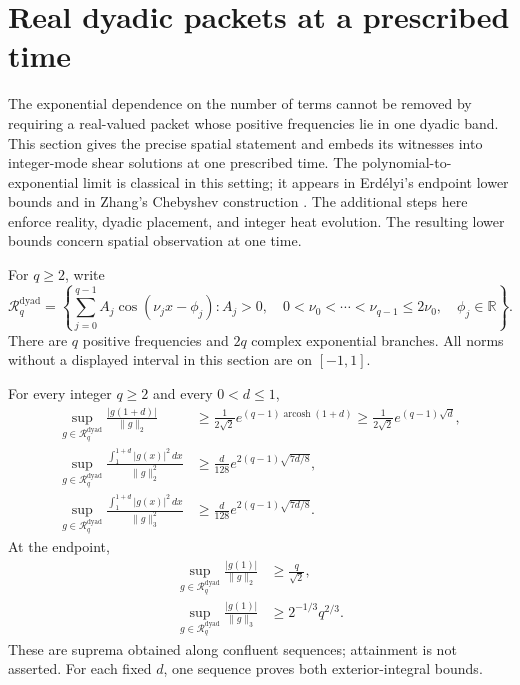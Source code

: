 \section{Real dyadic packets at a prescribed time}
\label{sec:sharpness}

The exponential dependence on the number of terms cannot be removed by
requiring a real-valued packet whose positive frequencies lie in one
dyadic band. This section gives the precise spatial statement and embeds
its witnesses into integer-mode shear solutions at one prescribed time.
The polynomial-to-exponential limit is classical in this setting; it
appears in Erd\'elyi's endpoint lower bounds \cite{Erdelyi2017} and in
Zhang's Chebyshev construction \cite[Proposition 7.1]{Zhang2026}.
The additional steps here enforce reality, dyadic placement, and integer
heat evolution. The resulting lower bounds concern spatial observation
at one time.

For $q\ge2$, write
\begin{equation}\label{eq:real-dyadic-class}
 \mathcal R_q^{\mathrm{dyad}}
 =\left\{\sum_{j=0}^{q-1} A_j\cos(\nu_jx-\phi_j):
 A_j>0,\quad 0<\nu_0<\cdots<\nu_{q-1}\le2\nu_0,\quad
 \phi_j\in\mathbb R\right\}.
\end{equation}
There are $q$ positive frequencies and $2q$ complex exponential branches.
All norms without a displayed interval in this section are on $[-1,1]$.

\begin{theorem}
\label{thm:real-dyadic-lower}
For every integer $q\ge2$ and every $0<d\le1$,
\begin{align}
 \sup_{g\in\mathcal R_q^{\mathrm{dyad}}}
 \frac{|g(1+d)|}{\|g\|_2}
 &\ge \frac{1}{2\sqrt2}
 e^{(q-1)\operatorname{arcosh}(1+d)}
 \ge \frac{1}{2\sqrt2}e^{(q-1)\sqrt d},
 \label{eq:dyadic-point-lower}\\
 \sup_{g\in\mathcal R_q^{\mathrm{dyad}}}
 \frac{\int_1^{1+d}|g(x)|^2\,dx}{\|g\|_2^2}
 &\ge \frac{d}{128}
 e^{2(q-1)\sqrt{7d/8}},\label{eq:dyadic-transfer-lower}\\
 \sup_{g\in\mathcal R_q^{\mathrm{dyad}}}
 \frac{\int_1^{1+d}|g(x)|^2\,dx}{\|g\|_3^2}
 &\ge \frac{d}{128}
 e^{2(q-1)\sqrt{7d/8}}.\label{eq:dyadic-l3-transfer}
\end{align}
At the endpoint,
\begin{align}
 \sup_{g\in\mathcal R_q^{\mathrm{dyad}}}
 \frac{|g(1)|}{\|g\|_2}&\ge\frac{q}{\sqrt2},
 \label{eq:dyadic-endpoint-l2}\\
 \sup_{g\in\mathcal R_q^{\mathrm{dyad}}}
 \frac{|g(1)|}{\|g\|_3}&\ge2^{-1/3}q^{2/3}.
 \label{eq:dyadic-endpoint-l3}
\end{align}
These are suprema obtained along confluent sequences; attainment is not
asserted. For each fixed $d$, one sequence proves both exterior-integral
bounds.
\end{theorem}

